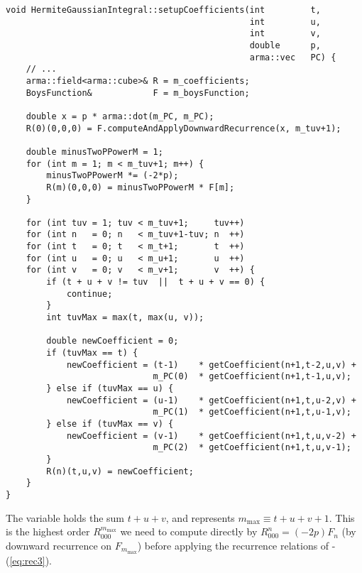 \documentclass[../../master.tex]{subfiles}
\begin{document}
\begin{lstlisting}[language={[std]c++}]
void HermiteGaussianIntegral::setupCoefficients(int         t,
                                                int         u,
                                                int         v,
                                                double      p,
                                                arma::vec   PC) {
    // ...
    arma::field<arma::cube>& R = m_coefficients;
    BoysFunction&            F = m_boysFunction;

    double x = p * arma::dot(m_PC, m_PC);
    R(0)(0,0,0) = F.computeAndApplyDownwardRecurrence(x, m_tuv+1);

    double minusTwoPPowerM = 1;
    for (int m = 1; m < m_tuv+1; m++) {
        minusTwoPPowerM *= (-2*p);
        R(m)(0,0,0) = minusTwoPPowerM * F[m];
    }

    for (int tuv = 1; tuv < m_tuv+1;     tuv++)
    for (int n   = 0; n   < m_tuv+1-tuv; n  ++)
    for (int t   = 0; t   < m_t+1;       t  ++)
    for (int u   = 0; u   < m_u+1;       u  ++)
    for (int v   = 0; v   < m_v+1;       v  ++) {
        if (t + u + v != tuv  ||  t + u + v == 0) {
            continue;
        }
        int tuvMax = max(t, max(u, v));

        double newCoefficient = 0;
        if (tuvMax == t) {
            newCoefficient = (t-1)    * getCoefficient(n+1,t-2,u,v) +
                             m_PC(0)  * getCoefficient(n+1,t-1,u,v);
        } else if (tuvMax == u) {
            newCoefficient = (u-1)    * getCoefficient(n+1,t,u-2,v) +
                             m_PC(1)  * getCoefficient(n+1,t,u-1,v);
        } else if (tuvMax == v) {
            newCoefficient = (v-1)    * getCoefficient(n+1,t,u,v-2) +
                             m_PC(2)  * getCoefficient(n+1,t,u,v-1);
        }
        R(n)(t,u,v) = newCoefficient;
    }
}
\end{lstlisting}
The  variable holds the sum $t+u+v$, and  represents $m_\text{max}\equiv t+u+v+1$. This is the highest order $R_{000}^{m_\text{max}}$ we need to compute directly by $R^n_{000}=(-2p)F_n$ (by downward recurrence on $F_{m_\text{max}}$) before applying the recurrence relations of -(\ref{eq:rec3}).
\end{document}

